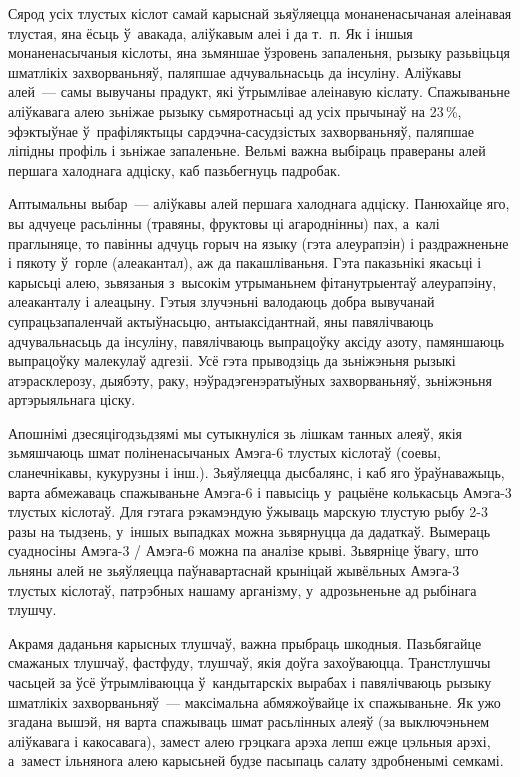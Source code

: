 Сярод усіх тлустых кіслот самай карыснай зьяўляецца монаненасычаная алеінавая тлустая, яна ёсьць ў~авакада, аліўкавым алеі і да т.~п. Як і іншыя монаненасычаныя кіслоты, яна зьмяншае ўзровень запаленьня, рызыку разьвіцьця шматлікіх захворваньняў, паляпшае адчувальнасьць да інсуліну. Аліўкавы алей~--- самы вывучаны прадукт, які ўтрымлівае алеінавую кіслату. Спажываньне аліўкавага алею зьніжае рызыку сьмяротнасьці ад усіх прычынаў на 23\,\%, эфэктыўнае ў~прафіляктыцы сардэчна-сасудзістых захворваньняў, паляпшае ліпідны профіль і зьніжае запаленьне. Вельмі важна выбіраць правераны алей першага халоднага адціску, каб пазьбегнуць падробак.

Аптымальны выбар~--- аліўкавы алей першага халоднага адціску. Панюхайце яго, вы адчуеце расьлінны (травяны, фруктовы ці агароднінны) пах, а~калі праглыняце, то павінны адчуць горыч на языку (гэта алеурапэін) і раздражненьне і пякоту ў~горле (алеакантал), аж да пакашліваньня. Гэта паказьнікі якасьці і карысьці алею, зьвязаныя з~высокім утрыманьнем фітанутрыентаў алеурапэіну, алеаканталу і алеацыну. Гэтыя злучэньні валодаюць добра вывучанай супрацьзапаленчай актыўнасьцю, антыаксідантнай, яны павялічваюць адчувальнасьць да інсуліну, павялічваюць выпрацоўку аксіду азоту, памяншаюць выпрацоўку малекулаў адгезіі. Усё гэта прыводзіць да зьніжэньня рызыкі атэрасклерозу, дыябэту, раку, нэўрадэгенэратыўных захворваньняў, зьніжэньня артэрыяльнага ціску.

Апошнімі дзесяцігодзьдзямі мы сутыкнуліся зь лішкам танных алеяў, якія зьмяшчаюць шмат поліненасычаных Амэга-6 тлустых кіслотаў (соевы, сланечнікавы, кукурузны і інш.). Зьяўляецца дысбалянс, і каб яго ўраўнаважыць, варта абмежаваць спажываньне Амэга-6 і павысіць у~рацыёне колькасьць Амэга-3 тлустых кіслотаў. Для гэтага рэкамэндую ўжываць марскую тлустую рыбу 2-3 разы на тыдзень, у~іншых выпадках можна зьвярнуцца да дадаткаў. Вымераць суадносіны Амэга-3 / Амэга-6 можна па аналізе крыві. Зьвярніце ўвагу, што льняны алей не зьяўляецца паўнавартаснай крыніцай жывёльных Амэга-3 тлустых кіслотаў, патрэбных нашаму арганізму, у~адрозьненьне ад рыбінага тлушчу.

Акрамя даданьня карысных тлушчаў, важна прыбраць шкодныя. Пазьбягайце смажаных тлушчаў, фастфуду, тлушчаў, якія доўга захоўваюцца. Транстлушчы часьцей за ўсё ўтрымліваюцца ў~кандытарскіх вырабах і павялічваюць рызыку шматлікіх захворваньняў~--- максімальна абмяжоўвайце іх спажываньне. Як ужо згадана вышэй, ня варта спажываць шмат расьлінных алеяў (за выключэньнем аліўкавага і какосавага), замест алею грэцкага арэха лепш ежце цэльныя арэхі, а~замест ільнянога алею карысьней будзе пасыпаць салату здробненымі семкамі.

